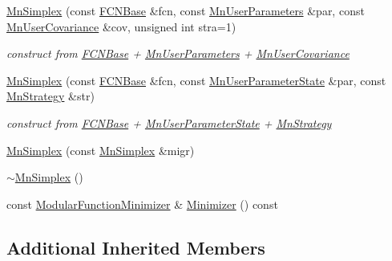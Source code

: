 \begin{DoxyCompactItemize}
\mbox{\hyperlink{classROOT_1_1Minuit2_1_1MnSimplex_a6583a53c38490030a1ff7fe80bdc69bc}{Mn\+Simplex}} (const \mbox{\hyperlink{classROOT_1_1Minuit2_1_1FCNBase}{F\+C\+N\+Base}} \&fcn, const \mbox{\hyperlink{classROOT_1_1Minuit2_1_1MnUserParameters}{Mn\+User\+Parameters}} \&par, const \mbox{\hyperlink{classROOT_1_1Minuit2_1_1MnUserCovariance}{Mn\+User\+Covariance}} \&cov, unsigned int stra=1)
\begin{DoxyCompactList}\small\item\em construct from \mbox{\hyperlink{classROOT_1_1Minuit2_1_1FCNBase}{F\+C\+N\+Base}} + \mbox{\hyperlink{classROOT_1_1Minuit2_1_1MnUserParameters}{Mn\+User\+Parameters}} + \mbox{\hyperlink{classROOT_1_1Minuit2_1_1MnUserCovariance}{Mn\+User\+Covariance}} \end{DoxyCompactList}\item 
\mbox{\hyperlink{classROOT_1_1Minuit2_1_1MnSimplex_a3dc51e6d9719501f7fce44a66444c6d2}{Mn\+Simplex}} (const \mbox{\hyperlink{classROOT_1_1Minuit2_1_1FCNBase}{F\+C\+N\+Base}} \&fcn, const \mbox{\hyperlink{classROOT_1_1Minuit2_1_1MnUserParameterState}{Mn\+User\+Parameter\+State}} \&par, const \mbox{\hyperlink{classROOT_1_1Minuit2_1_1MnStrategy}{Mn\+Strategy}} \&str)
\begin{DoxyCompactList}\small\item\em construct from \mbox{\hyperlink{classROOT_1_1Minuit2_1_1FCNBase}{F\+C\+N\+Base}} + \mbox{\hyperlink{classROOT_1_1Minuit2_1_1MnUserParameterState}{Mn\+User\+Parameter\+State}} + \mbox{\hyperlink{classROOT_1_1Minuit2_1_1MnStrategy}{Mn\+Strategy}} \end{DoxyCompactList}\item 
\mbox{\hyperlink{classROOT_1_1Minuit2_1_1MnSimplex_a47aec4c766dc559a1a1e1fe7809d0a88}{Mn\+Simplex}} (const \mbox{\hyperlink{classROOT_1_1Minuit2_1_1MnSimplex}{Mn\+Simplex}} \&migr)
\item 
\mbox{\hyperlink{classROOT_1_1Minuit2_1_1MnSimplex_a0cab2c1cf29e82fdd340eb78e0cd7ff2}{$\sim$\+Mn\+Simplex}} ()
\item 
const \mbox{\hyperlink{classROOT_1_1Minuit2_1_1ModularFunctionMinimizer}{Modular\+Function\+Minimizer}} \& \mbox{\hyperlink{classROOT_1_1Minuit2_1_1MnSimplex_a8fa3495353e667d85e7dbeaffa94b94c}{Minimizer}} () const
\end{DoxyCompactItemize}
\subsection*{Additional Inherited Members}


